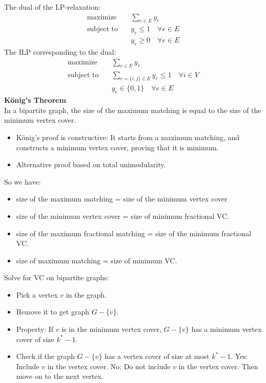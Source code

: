 \documentclass[onecolumn]{report}
\begin{document}
The dual of the LP-relaxation:
\begin{equation*}
    \begin{aligned}
    \text{maximize} \quad & \sum_{e \in E} y_e\\
    \text{subject to} \quad & y_e \leq 1 \quad \forall e \in E\\
    & y_e \geq 0 \quad \forall e \in E
    \end{aligned}
\end{equation*}
The ILP corresponding to the dual:
\begin{equation*}
    \begin{aligned}
    \text{maximize} \quad & \sum_{e \in E} y_e\\
    \text{subject to} \quad & \sum_{e=\{i,j\} \in E} y_e \leq 1 \quad \forall i \in V\\
    & y_e \in \{0,1\} \quad \forall e \in E
    \end{aligned}
\end{equation*}
\textbf{König's Theorem}\\
In a bipartite graph, the size of the maximum matching is equal to the size of the minimum vertex cover.
\begin{itemize}
    \item König's proof is constructive: It starts from a maximum matching, and constructs a minimum vertex cover, proving that it is minimum.
    \item Alternative proof based on total unimodularity.
\end{itemize}
So we have:
\begin{itemize}
    \item size of the maximum matching = size of the minimum vertex cover
    \item size of the minimum vertex cover = size of minimum fractional VC.
    \item size of the maximum fractional matching = size of the minimum fractional VC.
    \item size of maximum matching = size of minimum VC.
\end{itemize}
Solve for VC on bipartite graphs:
\begin{itemize}
    \item Pick a vertex $v$ in the graph.
    \item Remove it to get graph $G-\{v\}$.
    \item Property: If $v$ is in the minimum vertex cover, $G-\{v\}$ has a minimum vertex cover of size $k^*-1$.
    \item Check if the graph $G-\{v\}$ has a vertex cover of size at most $k^*-1$.
    \subitem Yes: Include $v$ in the vertex cover.
    \subitem No: Do not include $v$ in the vertex cover.
    \subitem Then move on to the next vertex.
\end{itemize}
\end{document}

